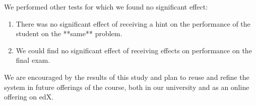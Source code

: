 \documentclass{llncs2e/llncs}
\begin{document}
We performed other tests for which we found no significant effect:
\begin{enumerate}
\item There was no significant effect of receiving a hint on the
  performance of the student on the **same** problem.
\item We could find no significant effect of receiving effects on
  performance on the final exam.
\end{enumerate}

We are encouraged by the results of this study and plan to reuse and refine the system in future offerings of the course, both in our
university and as an online offering on edX.



\end{document}
